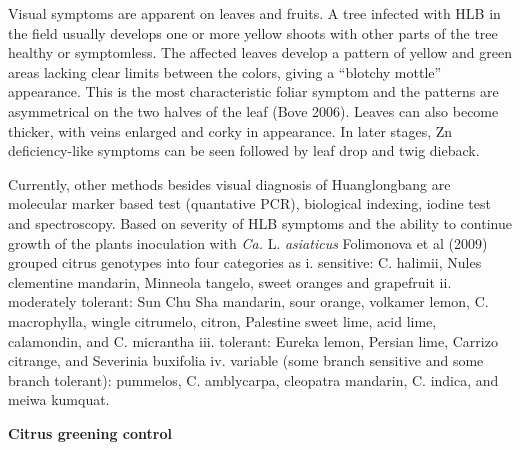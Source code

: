 \documentclass[
]{book}
\begin{document}
Visual symptoms are apparent on leaves and fruits. A tree infected with HLB in the field usually develops one or more yellow shoots with other parts of the tree healthy or symptomless. The affected leaves develop a pattern of yellow and green areas lacking clear limits between the colors, giving a ``blotchy mottle'' appearance. This is the most characteristic foliar symptom and the patterns are asymmetrical on the two halves of the leaf (Bove 2006). Leaves can also become thicker, with veins enlarged and corky in appearance. In later stages, Zn deficiency-like symptoms can be seen followed by leaf drop and twig dieback.

Currently, other methods besides visual diagnosis of Huanglongbang are molecular marker based test (quantative PCR), biological indexing, iodine test and spectroscopy. Based on severity of HLB symptoms and the ability to continue growth of the plants inoculation with \emph{Ca.} L. \emph{asiaticus} Folimonova et al (2009) grouped citrus genotypes into four categories as
i. sensitive: C. halimii, Nules clementine mandarin, Minneola tangelo, sweet oranges and grapefruit
ii. moderately tolerant: Sun Chu Sha mandarin, sour orange, volkamer lemon, C. macrophylla, wingle citrumelo, citron, Palestine sweet lime, acid lime, calamondin, and C. micrantha
iii. tolerant: Eureka lemon, Persian lime, Carrizo citrange, and Severinia buxifolia
iv. variable (some branch sensitive and some branch tolerant): pummelos, C. amblycarpa, cleopatra mandarin, C. indica, and meiwa kumquat.

\textbf{Citrus greening control}
\end{document}
